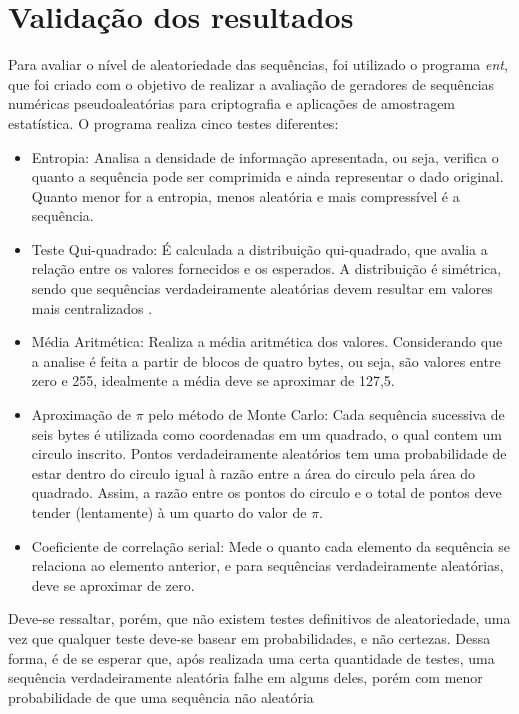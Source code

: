 \section{Validação dos resultados}
Para avaliar o nível de aleatoriedade das sequências, foi utilizado o programa \textit{ent}, que foi criado com o objetivo de realizar a avaliação de geradores de sequências numéricas pseudoaleatórias para criptografia e aplicações de amostragem estatística. O programa realiza cinco testes diferentes:
\begin{itemize}
\item Entropia: Analisa a densidade de informação apresentada, ou seja, verifica o quanto a sequência pode ser comprimida e ainda representar o dado original. Quanto menor for a entropia, menos aleatória e mais compressível é a sequência.
\item Teste Qui-quadrado: É calculada a distribuição qui-quadrado, que avalia a relação entre os valores fornecidos e os esperados. A distribuição é simétrica, sendo que sequências verdadeiramente aleatórias devem resultar em valores mais centralizados \cite{knuth1998art}.
\item Média Aritmética: Realiza a média aritmética dos valores. Considerando que a analise é feita a partir de blocos de quatro bytes, ou seja, são valores entre zero e 255, idealmente a média deve se aproximar de 127,5. 
\item Aproximação de $\pi$ pelo método de Monte Carlo: Cada sequência sucessiva de seis bytes é utilizada como coordenadas em um quadrado, o qual contem um circulo inscrito. Pontos verdadeiramente aleatórios tem uma probabilidade de estar dentro do circulo igual à razão entre a área do circulo pela área do quadrado. Assim, a razão entre os pontos do circulo e o total de pontos deve tender (lentamente) à um quarto do valor de $\pi$.
\item Coeficiente de correlação serial: Mede o quanto cada elemento da sequência se relaciona ao elemento anterior, e para sequências verdadeiramente aleatórias, deve se aproximar de zero.
\end{itemize}
Deve-se ressaltar, porém, que não existem testes definitivos de aleatoriedade, uma vez que qualquer teste deve-se basear em probabilidades, e não certezas. Dessa forma, é de se esperar que, após realizada uma certa quantidade de testes, uma sequência verdadeiramente aleatória falhe em alguns deles, porém com menor probabilidade de que uma sequência não aleatória